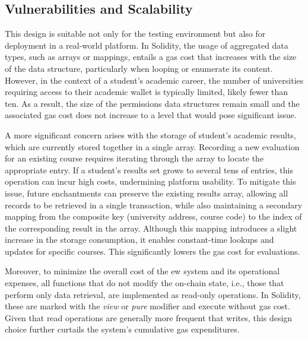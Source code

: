 \subsection{Vulnerabilities and Scalability}
This design is suitable not only for the testing environment but also for deployment in a real-world platform. In Solidity, the usage of aggregated data types, such as arrays or mappings, entails a gas cost that increases with the size of the data structure, particularly when looping or enumerate its content. However, in the context of a student's academic career, the number of universities requiring access to their academic wallet is typically limited, likely fewer than ten. As a result, the size of the permissions data structures remain small and the associated gas cost does not increase to a level that would pose significant issue.

A more significant concern arises with the storage of student's academic results, which are currently stored together in a single array. Recording a new evaluation for an existing course requires iterating through the array to locate the appropriate entry. If a student's results set grows to several tens of entries, this operation can incur high costs, undermining platform usability. To mitigate this issue, future enchantments can preserve the existing results array, allowing all records to be retrieved in a single transaction, while also maintaining a secondary mapping from the composite key (university address, course code) to the index of the corresponding result in the array. Although this mapping introduces a slight increase in the storage consumption, it enables constant-time lookups and updates for specific courses. This significantly lowers the gas cost for evaluations.  

Moreover, to minimize the overall cost of the \gls{ew} system and its operational expenses, all functions that do not modify the on-chain state, i.e., those that perform only data retrieval, are implemented as read-only operations. In Solidity, these are marked with the \textit{view} or \textit{pure} modifier and execute without gas cost. Given that read operations are generally more frequent that writes, this design choice further curtails the system's cumulative gas expenditures.

